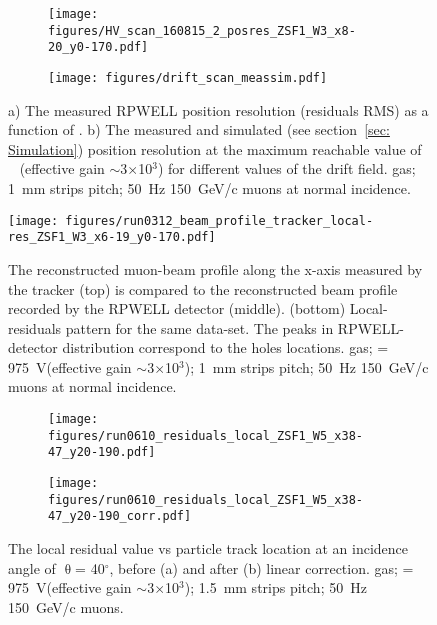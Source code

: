 \begin{figure}[h]
\begin{subfigure}[t]{0.5\textwidth}\caption{}
\texttt{[image: figures/HV\_scan\_160815\_2\_posres\_ZSF1\_W3\_x8-20\_y0-170.pdf]}
\end{subfigure}
\begin{subfigure}[t]{0.5\textwidth}\caption{}
\texttt{[image: figures/drift\_scan\_meassim.pdf]}
\end{subfigure}
\caption{a) The measured RPWELL position resolution (residuals RMS) as a function of \dvrpwell.  b) The measured and simulated (see section~\ref{sec: Simulation}) position resolution at the maximum reachable value of \dvrpwell~ (effective gain $\sim$3$\times$10$^3$) for different values of the drift field. \nech gas; 1~mm strips pitch; 50~Hz 150~GeV/c muons at normal incidence. }\label{fig: HV scan - drift scan}
\end{figure}

\begin{figure}[h]
\centering
\texttt{[image: figures/run0312\_beam\_profile\_tracker\_local-res\_ZSF1\_W3\_x6-19\_y0-170.pdf]}
\caption{The reconstructed muon-beam profile along the x-axis measured by the tracker (top) is compared to the reconstructed beam profile recorded by the RPWELL detector (middle). (bottom) Local-residuals pattern for the same data-set. The peaks in RPWELL-detector distribution correspond to the holes locations. \nech gas; \dvrpwell= 975~V(effective gain $\sim$3$\times$10$^3$); 1~mm strips pitch; 50~Hz 150~GeV/c muons at normal incidence.}\label{fig: profile - local residuals}
\end{figure}

\begin{figure}[h]
\begin{subfigure}[t]{0.5\textwidth}\caption{}
\texttt{[image: figures/run0610\_residuals\_local\_ZSF1\_W5\_x38-47\_y20-190.pdf]}
\end{subfigure}
\begin{subfigure}[t]{0.5\textwidth}\caption{}
\texttt{[image: figures/run0610\_residuals\_local\_ZSF1\_W5\_x38-47\_y20-190\_corr.pdf]}
\end{subfigure}
\caption{The local residual value vs particle track location at an incidence angle of $\uptheta$= 40$^\circ$, before (a) and after (b) linear correction. \nech gas; \dvrpwell= 975~V(effective gain $\sim$3$\times$10$^3$); 1.5~mm strips pitch; 50~Hz 150~GeV/c muons.}\label{fig: angle correction}
\end{figure}

